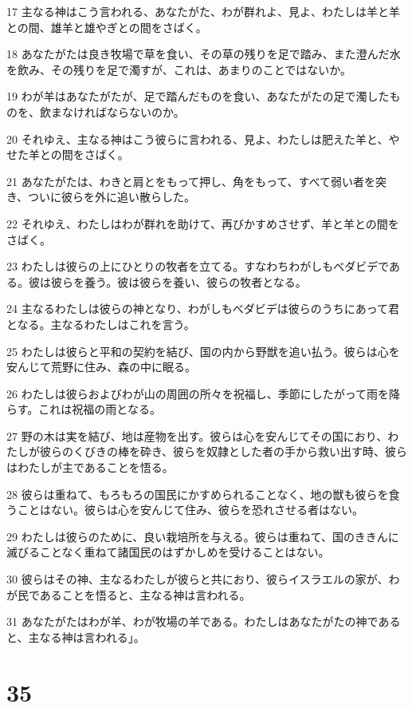 \par 17 主なる神はこう言われる、あなたがた、わが群れよ、見よ、わたしは羊と羊との間、雄羊と雄やぎとの間をさばく。
\par 18 あなたがたは良き牧場で草を食い、その草の残りを足で踏み、また澄んだ水を飲み、その残りを足で濁すが、これは、あまりのことではないか。
\par 19 わが羊はあなたがたが、足で踏んだものを食い、あなたがたの足で濁したものを、飲まなければならないのか。
\par 20 それゆえ、主なる神はこう彼らに言われる、見よ、わたしは肥えた羊と、やせた羊との間をさばく。
\par 21 あなたがたは、わきと肩とをもって押し、角をもって、すべて弱い者を突き、ついに彼らを外に追い散らした。
\par 22 それゆえ、わたしはわが群れを助けて、再びかすめさせず、羊と羊との間をさばく。
\par 23 わたしは彼らの上にひとりの牧者を立てる。すなわちわがしもべダビデである。彼は彼らを養う。彼は彼らを養い、彼らの牧者となる。
\par 24 主なるわたしは彼らの神となり、わがしもべダビデは彼らのうちにあって君となる。主なるわたしはこれを言う。
\par 25 わたしは彼らと平和の契約を結び、国の内から野獣を追い払う。彼らは心を安んじて荒野に住み、森の中に眠る。
\par 26 わたしは彼らおよびわが山の周囲の所々を祝福し、季節にしたがって雨を降らす。これは祝福の雨となる。
\par 27 野の木は実を結び、地は産物を出す。彼らは心を安んじてその国におり、わたしが彼らのくびきの棒を砕き、彼らを奴隷とした者の手から救い出す時、彼らはわたしが主であることを悟る。
\par 28 彼らは重ねて、もろもろの国民にかすめられることなく、地の獣も彼らを食うことはない。彼らは心を安んじて住み、彼らを恐れさせる者はない。
\par 29 わたしは彼らのために、良い栽培所を与える。彼らは重ねて、国のききんに滅びることなく重ねて諸国民のはずかしめを受けることはない。
\par 30 彼らはその神、主なるわたしが彼らと共におり、彼らイスラエルの家が、わが民であることを悟ると、主なる神は言われる。
\par 31 あなたがたはわが羊、わが牧場の羊である。わたしはあなたがたの神であると、主なる神は言われる」。

\chapter{35}

